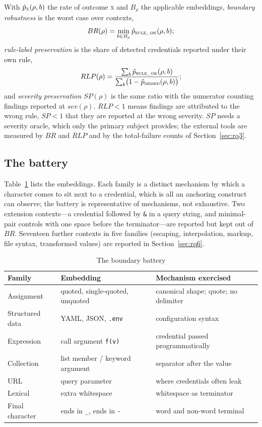 \documentclass[10pt,journal,compsoc]{IEEEtran}
\begin{document}
With $\hat p_{\textsc{x}}(\rho,b)$ the rate of outcome \textsc{x} and $B_\rho$ the applicable embeddings, \emph{boundary robustness} is the worst case over contexts,
\begin{equation}
BR(\rho)=\min_{b\in B_\rho}\hat p_{\textsc{rule\_ok}}(\rho,b);
\end{equation}
\emph{rule-label preservation} is the share of detected credentials reported under their own rule,
\begin{equation}
RLP(\rho)=\frac{\sum_{b}\hat p_{\textsc{rule\_ok}}(\rho,b)}{\sum_{b}\bigl(1-\hat p_{\textsc{missed}}(\rho,b)\bigr)};
\end{equation}
and \emph{severity preservation} $SP(\rho)$ is the same ratio with the numerator counting findings reported at $sev(\rho)$. $RLP<1$ means findings are attributed to the wrong rule, $SP<1$ that they are reported at the wrong severity. $SP$ needs a severity oracle, which only the primary subject provides; the external tools are measured by $BR$ and $RLP$ and by the total-failure counts of Section~\ref{sec:rq3}.

\subsection{The battery}
\label{sec:battery}

Table~\ref{tab:battery} lists the embeddings. Each family is a distinct mechanism by which a character comes to sit next to a credential, which is all an anchoring construct can observe; the battery is representative of mechanisms, not exhaustive. Two extension contexts---a credential followed by \texttt{\&} in a query string, and minimal-pair controls with one space before the terminator---are reported but kept out of $BR$. Seventeen further contexts in five families (escaping, interpolation, markup, file syntax, transformed values) are reported in Section~\ref{sec:rq6}.

\begin{table}[t]
\centering
\caption{The boundary battery}
\label{tab:battery}
\footnotesize
\setlength{\tabcolsep}{3pt}
\begin{tabular}{@{}p{1.55cm}p{2.85cm}p{3.35cm}@{}}
\toprule
Family & Embedding & Mechanism exercised \\
\midrule
Assignment & quoted, single-quoted, unquoted & canonical shape; quote; no delimiter \\
Structured data & YAML, JSON, \texttt{.env} & configuration syntax \\
Expression & call argument \texttt{f(v)} & credential passed programmatically \\
Collection & list member / keyword argument & separator after the value \\
URL & query parameter & where credentials often leak \\
Lexical & extra whitespace & whitespace as terminator \\
Final character & ends in \texttt{\_}, ends in \texttt{-} & word and non-word terminal \\
\bottomrule
\end{tabular}
\end{table}
\end{document}
